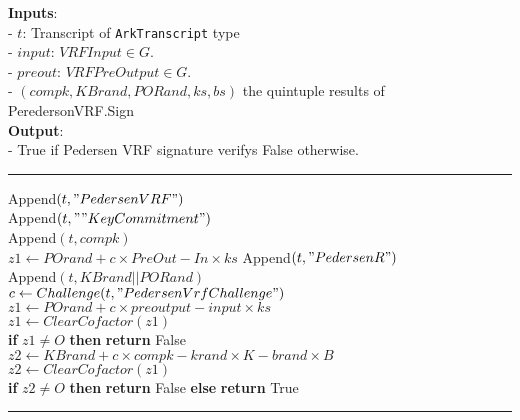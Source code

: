 \documentclass[
]{article}
\begin{document}
\textbf{Inputs}:\\
- \(t\): Transcript of \texttt{ArkTranscript} type\\
- \(input\): \(VRFInput \in G\).\\
- \(preout\): \(VRFPreOutput \in G\).\\
- \((compk, KBrand, PORand, ks, bs)\) the quintuple results of
PeredersonVRF.Sign\\
\textbf{Output}:\\
- True if Pedersen VRF signature verifys False otherwise.

\begin{center}\rule{0.5\linewidth}{0.5pt}\end{center}

Append\((t, "PedersenVRF")\)\\
Append\((t, ""KeyCommitment")\)\\
Append\((t, compk)\)\\
\(z1 \leftarrow POrand + c \times PreOut - In \times ks\)
Append\((t, "Pedersen R")\)\\
Append\((t, KBrand || PORand)\)\\
\(c \leftarrow Challenge(t, "PedersenVrfChallenge")\)\\
\(z1 \leftarrow POrand + c \times preoutput - input \times ks\)\\
\(z1 \leftarrow ClearCofactor(z1)\)\\
\textbf{if} \(z1 \neq O\) \textbf{then} \textbf{return} False\\
\(z2 \leftarrow KBrand + c \times compk - krand \times K - brand \times B\)\\
\(z2 \leftarrow ClearCofactor(z1)\)\\
\textbf{if} \(z2 \neq O\) \textbf{then} \textbf{return} False
\textbf{else} \textbf{return} True

\begin{center}\rule{0.5\linewidth}{0.5pt}\end{center}
\end{document}
